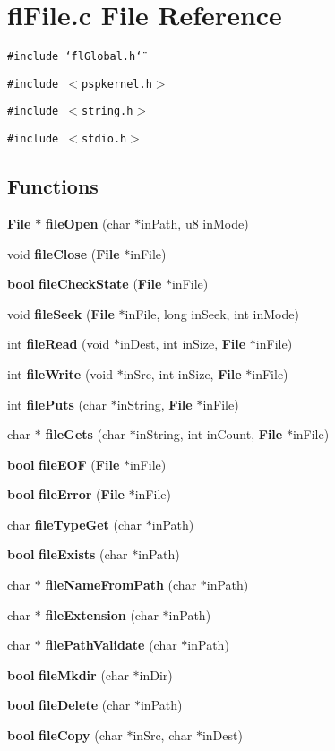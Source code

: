 \section{fl\-File.c File Reference}
\label{flFile_8c}
{\tt \#include \char`\"{}fl\-Global.h\char`\"{}}\par
{\tt \#include $<$pspkernel.h$>$}\par
{\tt \#include $<$string.h$>$}\par
{\tt \#include $<$stdio.h$>$}\par
\subsection*{Functions}
\begin{CompactItemize}
\item 
{\bf File} $\ast$ {\bf file\-Open} (char $\ast$in\-Path, u8 in\-Mode)
\item 
void {\bf file\-Close} ({\bf File} $\ast$in\-File)
\item 
{\bf bool} {\bf file\-Check\-State} ({\bf File} $\ast$in\-File)
\item 
void {\bf file\-Seek} ({\bf File} $\ast$in\-File, long in\-Seek, int in\-Mode)
\item 
int {\bf file\-Read} (void $\ast$in\-Dest, int in\-Size, {\bf File} $\ast$in\-File)
\item 
int {\bf file\-Write} (void $\ast$in\-Src, int in\-Size, {\bf File} $\ast$in\-File)
\item 
int {\bf file\-Puts} (char $\ast$in\-String, {\bf File} $\ast$in\-File)
\item 
char $\ast$ {\bf file\-Gets} (char $\ast$in\-String, int in\-Count, {\bf File} $\ast$in\-File)
\item 
{\bf bool} {\bf file\-EOF} ({\bf File} $\ast$in\-File)
\item 
{\bf bool} {\bf file\-Error} ({\bf File} $\ast$in\-File)
\item 
char {\bf file\-Type\-Get} (char $\ast$in\-Path)
\item 
{\bf bool} {\bf file\-Exists} (char $\ast$in\-Path)
\item 
char $\ast$ {\bf file\-Name\-From\-Path} (char $\ast$in\-Path)
\item 
char $\ast$ {\bf file\-Extension} (char $\ast$in\-Path)
\item 
char $\ast$ {\bf file\-Path\-Validate} (char $\ast$in\-Path)
\item 
{\bf bool} {\bf file\-Mkdir} (char $\ast$in\-Dir)
\item 
{\bf bool} {\bf file\-Delete} (char $\ast$in\-Path)
\item 
{\bf bool} {\bf file\-Copy} (char $\ast$in\-Src, char $\ast$in\-Dest)
\end{CompactItemize}


